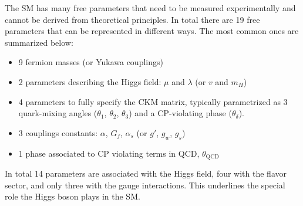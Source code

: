 The SM has many free parameters that need to be measured experimentally and cannot be derived from theoretical principles.  
In total there are 19 free parameters that can be represented in different ways. The most common ones are summarized below:
\begin{itemize}
  \item 9 fermion masses (or Yukawa couplings)
  \item 2 parameters describing the Higgs field: $\mu$ and $\lambda$ (or $v$ and $m_H$)
  \item 4 parameters to fully specify the CKM matrix, typically parametrized as 3 quark-mixing angles ($\theta_1$, $\theta_2$, $\theta_3$) and a CP-violating phase ($\theta_\delta$).
  \item 3 couplings constants: $\alpha$, $G_f$, $\alpha_s$ (or $g'$, $g_w$, $g_s$)
  \item 1 phase associated to CP violating terms in QCD, $\theta_{\text{QCD}}$
\end{itemize}
In total 14 parameters are associated with the Higgs field, four with the flavor sector, and only three with the gauge interactions. This underlines the special role the Higgs boson plays in the SM.


